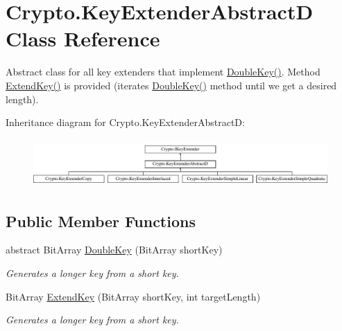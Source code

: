 \hypertarget{class_crypto_1_1_key_extender_abstract_d}{}\section{Crypto.\+Key\+Extender\+Abstract\+D Class Reference}
\label{class_crypto_1_1_key_extender_abstract_d}


Abstract class for all key extenders that implement \hyperlink{class_crypto_1_1_key_extender_abstract_d_ae403b92e9038b9c0bc7a21885e24ffc7}{Double\+Key()}. Method \hyperlink{class_crypto_1_1_key_extender_abstract_d_a3ec7fa96f391d840043eff0c8409d130}{Extend\+Key()} is provided (iterates \hyperlink{class_crypto_1_1_key_extender_abstract_d_ae403b92e9038b9c0bc7a21885e24ffc7}{Double\+Key()} method until we get a desired length).  


Inheritance diagram for Crypto.\+Key\+Extender\+Abstract\+D\+:\begin{figure}[H]
\begin{center}
\leavevmode
\includegraphics[height=1.850220cm]{class_crypto_1_1_key_extender_abstract_d}
\end{center}
\end{figure}
\subsection*{Public Member Functions}
\begin{DoxyCompactItemize}
\item 
abstract Bit\+Array \hyperlink{class_crypto_1_1_key_extender_abstract_d_ae403b92e9038b9c0bc7a21885e24ffc7}{Double\+Key} (Bit\+Array short\+Key)
\begin{DoxyCompactList}\small\item\em Generates a longer key from a short key. \end{DoxyCompactList}\item 
Bit\+Array \hyperlink{class_crypto_1_1_key_extender_abstract_d_a3ec7fa96f391d840043eff0c8409d130}{Extend\+Key} (Bit\+Array short\+Key, int target\+Length)
\begin{DoxyCompactList}\small\item\em Generates a longer key from a short key. \end{DoxyCompactList}\end{DoxyCompactItemize}
